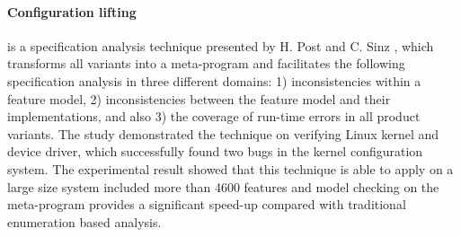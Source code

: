 





\paragraph{Configuration lifting} is a specification analysis technique presented by
H. Post and C. Sinz \cite{4639338}, which transforms all variants into a meta-program and facilitates the following specification analysis in three different domains: 1) inconsistencies within a feature model, 2) inconsistencies between the feature model and their implementations, and also 3) the coverage of run-time errors in all product variants. The study demonstrated the technique on verifying Linux kernel and device driver, which successfully found two bugs in the kernel configuration system. The experimental result showed that this technique is able to apply on a large size system included more than 4600 features and model checking on the meta-program provides a significant speed-up compared with traditional enumeration based analysis.

